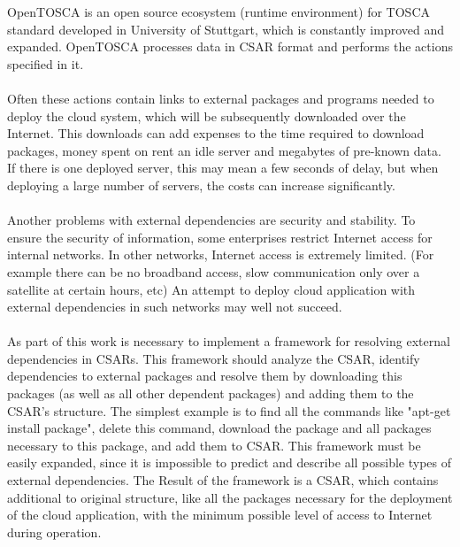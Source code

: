 OpenTOSCA \cite*{OpenTOSCA} is an open source ecosystem (runtime environment) for TOSCA standard developed in University of Stuttgart, which is constantly improved and expanded.
OpenTOSCA processes data in CSAR format and performs the actions specified in it.\\\\
Often these actions contain links to external packages and programs needed to deploy the cloud system, which will be subsequently downloaded over the Internet.
This downloads can add expenses to the time required to download packages, money spent on rent an idle server and megabytes of pre-known data.
If there is one deployed server, this may mean a few seconds of delay, but when deploying a large number of servers, the costs can increase significantly.\\\\
Another problems with external dependencies are security and stability.
To ensure the security of information, some enterprises restrict Internet access for internal networks.
In other networks, Internet access is extremely limited.
(For example there can be no broadband access, slow communication only over a satellite at certain hours, etc)
An attempt to deploy cloud application with external dependencies in such networks may well not succeed. \\\\
As part of this work is necessary to implement a framework for resolving external dependencies in CSARs.
This framework should analyze the CSAR, identify dependencies to external packages and resolve them by downloading this packages (as well as all other dependent packages) and adding them to the CSAR's structure.
The simplest example is to find all the commands like "apt-get install package", delete this command, download the package and all packages necessary to this package, and add them to CSAR.
This framework must be easily expanded, since it is impossible to predict and describe all possible types of external dependencies.
The Result of the framework is a CSAR, which contains additional to original structure, like all the packages necessary for the deployment of the cloud application, with the minimum possible level of access to Internet during operation.

